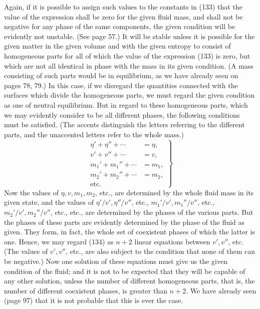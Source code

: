 \documentclass[11pt]{article}
\begin{document}
Again, if it is possible to assign such values to the constants in (133) that the value of the expression shall be zero for the given fluid mass, and shall not be negative for any phase of the same components, the given condition will be evidently not unstable. (See page 57.) It will be stable unless it is possible for the given matter in the given volume and with the given entropy to consist of homogeneous parts for all of which the value of the expression (133) is zero, but which are not all identical in phase with the mass in its given condition. (A mass consisting of such parts would be in equilibrium, as we have already seen on pages 78, 79.) In this case, if we disregard the quantities connected with the surfaces which divide the homogeneous parts, we must regard the given condition as one of neutral equilibrium. But in regard to these homogeneous parts, which we may evidently consider to be all different phases, the following conditions must be satisfied. (The accents distinguish the letters referring to the different parts, and the unaccented letters refer to the whole mass.)
\begin{equation}
\left.\begin{aligned}
\eta'+\eta''+\cdots&=\eta,\\
v'+v''+\cdots&=v,\\
m_1'+m_1''+\cdots&=m_1,\\
m_2'+m_2''+\cdots&=m_2,\\
\text{etc.}
\end{aligned}\right\}
\end{equation}
Now the values of \(\eta,v,m_1,m_2\), etc., are determined by the whole fluid mass in its given state, and the values of \(\eta'/v',\eta''/v''\), etc., \(m_1'/v',m_1''/v''\), etc., \(m_2'/v',m_2''/v''\), etc., etc., are determined by the phases of the various parts. But the phases of these parts are evidently determined by the phase of the fluid as given. They form, in fact, the whole set of coexistent phases of which the latter is one. Hence, we may regard (134) as \(n+2\) linear equations between \(v',v''\), etc. (The values of \(v',v''\), etc., are also subject to the condition that none of them can be negative.) Now one solution of these equations must give us the given condition of the fluid; and it is not to be expected that they will be capable of any other solution, unless the number of different homogeneous parts, that is, the number of different coexistent phases, is greater than \(n+2\). We have already seen (page 97) that it is not probable that this is ever the case.
\end{document}

